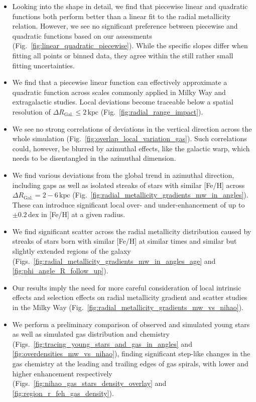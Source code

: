 \documentclass[twocolumn,apj,numberedappendix,appendixfloats]{openjournal}
\begin{document}
\begin{CJK*}{UTF8}{gbsn}
\begin{itemize}
    \item Looking into the shape in detail, we find that piecewise linear and quadratic functions both perform better than a linear fit to the radial metallicity relation. However, we see no significant preference between piecewise and quadratic functions based on our assessments (Fig.~\ref{fig:linear_quadratic_piecewise}). While the specific slopes differ when fitting all points or binned data, they agree within the still rather small fitting uncertainties.
    \item We find that a piecewise linear function can effectively approximate a quadratic function across scales commonly applied in Milky Way and extragalactic studies. Local deviations become traceable below a spatial resolution of $\Delta R_\mathrm{Gal.} \leq 2\,\mathrm{kpc}$ (Fig.~\ref{fig:radial_range_impact}).
    \item We see no strong correlations of deviations in the vertical direction across the whole simulation (Fig.~\ref{fig:overlap_local_variation_gas}). Such correlations could, however, be blurred by azimuthal effects, like the galactic warp, which needs to be disentangled in the azimuthal dimension. 
    \item We find various deviations from the global trend in azimuthal direction, including gaps as well as isolated streaks of stars with similar [Fe/H] across $\Delta R_\mathrm{Gal.} = 2-6\,\mathrm{kpc}$ (Fig.~\ref{fig:radial_metallicity_gradients_mw_in_angles}). These can introduce significant local over- and under-enhancement of up to $\pm 0.2\,\mathrm{dex}$ in [Fe/H] at a given radius.
    \item We find significant scatter across the radial metallicity distribution caused by streaks of stars born with similar [Fe/H] at similar times and similar but slightly extended regions of the galaxy (Figs.~\ref{fig:radial_metallicity_gradients_mw_in_angles_age} and \ref{fig:phi_angle_R_follow_up}).
    \item Our results imply the need for more careful consideration of local intrinsic effects and selection effects on radial metallicity gradient and scatter studies in the Milky Way (Fig.~\ref{fig:radial_metallicity_gradients_mw_vs_nihao}).
    \item We perform a preliminary comparison of observed and simulated young stars as well as simulated gas distribution and chemistry (Figs.~\ref{fig:tracing_young_stars_and_gas_in_angles} and \ref{fig:overdensities_mw_vs_nihao}), finding significant step-like changes in the gas chemistry at the leading and trailing edges of gas spirals, with lower and higher enhancement respectively (Figs.~\ref{fig:nihao_gas_stars_density_overlay} and \ref{fig:region_r_feh_gas_density}).

\end{itemize}
\end{CJK*}
\end{document}
